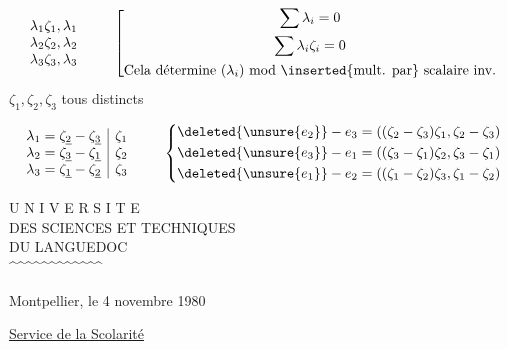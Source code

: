\[
\begin{array}{l}
\lambda_1\zeta_1,\lambda_1\\
\lambda_2\zeta_2,\lambda_2\\
\lambda_3\zeta_3,\lambda_3
\end{array}
\qquad
\left[\begin{gathered}
\sum\lambda_i=0\\
\sum\lambda_i\zeta_i=0\\
\text{Cela détermine }(\lambda_i)\text{ mod }\inserted{\text{mult. par}}\text{ scalaire inv.}
\end{gathered}\right.
\]
$\zeta_1,\zeta_2,\zeta_3$ tous distincts

\[
\begin{array}{l|l}
\lambda_1=\zeta_{\underline2}-\zeta_{\underline3}&\zeta_1\\
\lambda_2=\zeta_{\underline3}-\zeta_{\underline1}&\zeta_2\\
\lambda_3=\zeta_{\underline1}-\zeta_{\underline2}&\zeta_3
\end{array}
\qquad
\left\{\begin{aligned}
\deleted{\unsure{e_2}}-e_3&=((\zeta_2-\zeta_3)\zeta_1,\zeta_2-\zeta_3)\\
\deleted{\unsure{e_3}}-e_1&=((\zeta_3-\zeta_1)\zeta_2,\zeta_3-\zeta_1)\\
\deleted{\unsure{e_1}}-e_2&=((\zeta_1-\zeta_2)\zeta_3,\zeta_1-\zeta_2)
\end{aligned}\right.
\]

\begin{center}
U N I V E R S I T E\\
DES SCIENCES ET TECHNIQUES\\
DU LANGUEDOC\\
\textasciicircum\textasciicircum\textasciicircum\textasciicircum\textasciicircum\textasciicircum\textasciicircum\textasciicircum\textasciicircum\textasciicircum\textasciicircum\textasciicircum
\end{center}
Montpellier, le 4 novembre 1980

\uline{Service de la Scolarité}

